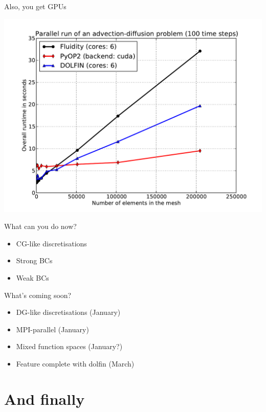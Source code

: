 \documentclass[bigger]{beamer}
\begin{document}
\begin{frame}[label={sec:orgheadline16}]{Also, you get GPUs}
\begin{center}
\includegraphics[width=.9\linewidth]{09-19-Moscow-PyOP2.figures/cuda.pdf}
\end{center}
\end{frame}

\begin{frame}[label={sec:orgheadline17}]{What can you do now?}
\begin{itemize}
\item CG-like discretisations
\item Strong BCs
\item Weak BCs
\end{itemize}
\end{frame}

\begin{frame}[label={sec:orgheadline18}]{What's coming soon?}
\begin{itemize}
\item DG-like discretisations (January)
\item MPI-parallel (January)
\item Mixed function spaces (January?)
\item Feature complete with dolfin (March)
\end{itemize}
\end{frame}

\section{And finally}
\label{sec:orgheadline22}
\end{document}
